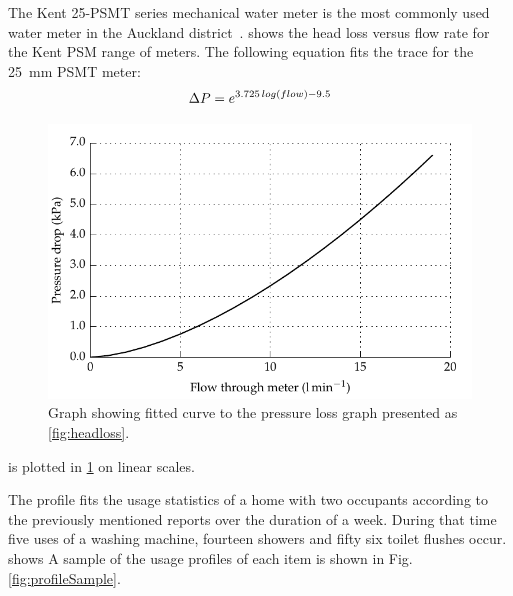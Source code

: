     The Kent 25-PSMT series mechanical water meter is the most commonly used water meter in the Auckland district~\cite{WatercareNewZealand2014}.
     shows the head loss versus flow rate for the Kent PSM range of meters.
    The following equation fits the trace for the \SI{25}{\milli\meter} PSMT meter:
    \begin{equation}
        \Delta P = e^{3.725\thinspace log(flow) - 9.5}
        \label{eqn:Flow_to_pressure_25mmPSMT}
    \end{equation}

    \begin{figure}
        \centering
        \includegraphics[width=\linewidth]{content/pt1/02-WirelessWaterMeter/graphics/graph_pressureLoss}
        \caption{Graph showing fitted curve to the pressure loss graph presented as \cref{fig:headloss}.}
        \label{fig:headloss_fit}
    \end{figure}

     is plotted in \cref{fig:headloss_fit} on linear scales.

    The profile fits the usage statistics of a home with two occupants according to the previously mentioned reports over the duration of a week.
    During that time five uses of a washing machine, fourteen showers and fifty six toilet flushes occur.
     shows
    A sample of the usage profiles of each item is shown in Fig. \ref{fig:profileSample}.

